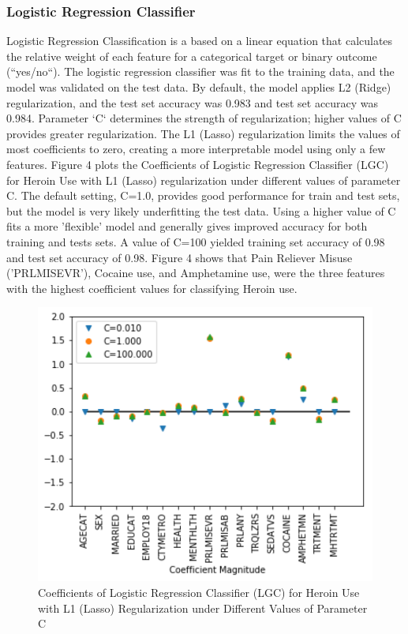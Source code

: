 \documentclass[sigconf]{acmart}
\begin{document}
\subsubsection{Logistic Regression Classifier}
Logistic Regression Classification is a based on a linear equation that 
calculates the relative weight of each feature for a categorical target or 
binary outcome (``yes/no``). The logistic regression classifier was fit to 
the training data, and the model was validated on the test data. By default, 
the model applies L2 (Ridge) regularization, and the test set accuracy 
was 0.983 and test set accuracy was 0.984. Parameter `C` determines the 
strength of regularization; higher values of C provides greater regularization. 
The L1 (Lasso) regularization limits the values of most coefficients to zero, 
creating a more interpretable model using only a few features. Figure 4 plots 
the Coefficients of Logistic Regression Classifier (LGC) for Heroin Use with 
L1 (Lasso) regularization under different values of parameter C. The default 
setting, C=1.0, provides good performance for train and test sets, but the 
model is very likely underfitting the test data. Using a higher value of C 
fits a more 'flexible' model and generally gives improved accuracy for both 
training and tests sets. A value of C=100 yielded training set accuracy of
0.98 and test set accuracy of 0.98. Figure 4 shows that Pain Reliever Misuse
('PRLMISEVR'), Cocaine use, and Amphetamine use, were the three features
with the highest coefficient values for classifying Heroin use. 

\begin{figure}[!ht]
  \centering\includegraphics[width=\columnwidth]{images/Figure4.pdf}
  \caption{Coefficients of Logistic Regression Classifier (LGC) for Heroin Use 
  with L1 (Lasso) Regularization under Different Values of Parameter C}
  \label{f:Figure4}
\end{figure}
\end{document}
